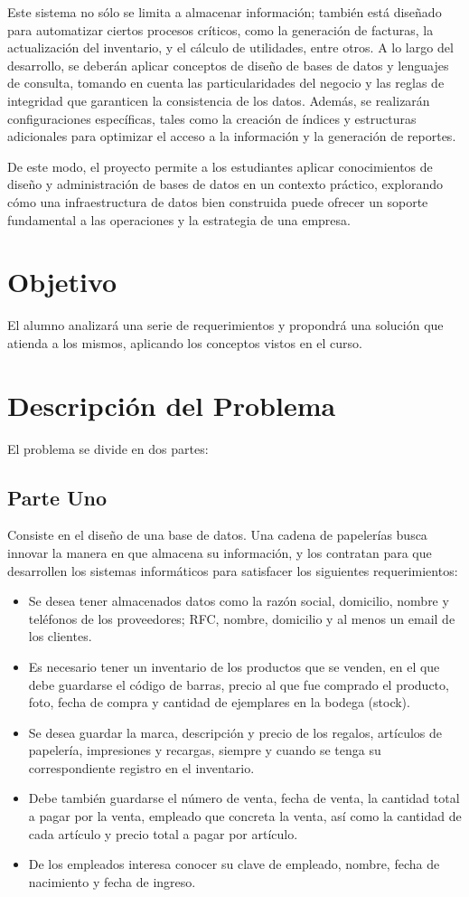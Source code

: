 \documentclass[10pt,openany]{book}
\begin{document}
Este sistema no sólo se limita a almacenar información; también está diseñado para automatizar ciertos procesos críticos, como la generación de facturas, la actualización del inventario, y el cálculo de utilidades, entre otros. A lo largo del desarrollo, se deberán aplicar conceptos de diseño de bases de datos y lenguajes de consulta, tomando en cuenta las particularidades del negocio y las reglas de integridad que garanticen la consistencia de los datos. Además, se realizarán configuraciones específicas, tales como la creación de índices y estructuras adicionales para optimizar el acceso a la información y la generación de reportes.

De este modo, el proyecto permite a los estudiantes aplicar conocimientos de diseño y administración de bases de datos en un contexto práctico, explorando cómo una infraestructura de datos bien construida puede ofrecer un soporte fundamental a las operaciones y la estrategia de una empresa.

\section{Objetivo}
El alumno analizará una serie de requerimientos y propondrá una solución que atienda a los mismos, aplicando los conceptos vistos en el curso.

\section{Descripción del Problema}
El problema se divide en dos partes:

\subsection{Parte Uno}
Consiste en el diseño de una base de datos. Una cadena de papelerías busca innovar la manera en que almacena su información, y los contratan para que desarrollen los sistemas informáticos para satisfacer los siguientes requerimientos:

\begin{itemize}
    \item Se desea tener almacenados datos como la razón social, domicilio, nombre y teléfonos de los proveedores; RFC, nombre, domicilio y al menos un email de los clientes.
    \item Es necesario tener un inventario de los productos que se venden, en el que debe guardarse el código de barras, precio al que fue comprado el producto, foto, fecha de compra y cantidad de ejemplares en la bodega (stock).
    \item Se desea guardar la marca, descripción y precio de los regalos, artículos de papelería, impresiones y recargas, siempre y cuando se tenga su correspondiente registro en el inventario.
    \item Debe también guardarse el número de venta, fecha de venta, la cantidad total a pagar por la venta, empleado que concreta la venta, así como la cantidad de cada artículo y precio total a pagar por artículo.
    \item De los empleados interesa conocer su clave de empleado, nombre, fecha de nacimiento y fecha de ingreso.
\end{itemize}
\end{document}
